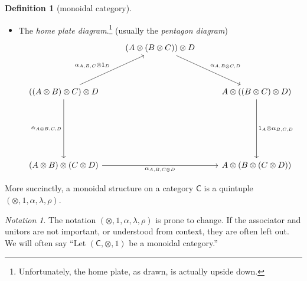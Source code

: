\documentclass[a4paper]{report}
\theoremstyle{definition}
\newtheorem{definition}{Definition}[section]
\theoremstyle{plain}
\theoremstyle{remark}
\newtheorem{notation}{Notation}[section]
\begin{document}
\begin{definition}[monoidal category]
\begin{itemize}
    \item The \emph{home plate diagram}.\footnote{Unfortunately, the home plate, as drawn, is actually upside down.} (usually the \emph{pentagon diagram})
      \begin{equation*}
        \begin{tikzcd}[row sep=huge]
          & (A \otimes (B \otimes C)) \otimes D 
          \arrow[dr, "\alpha_{A,B\otimes C, D}"] 
          \\
          ((A \otimes B) \otimes C) \otimes D 
          \arrow[ur, "\alpha_{A,B,C}\otimes 1_{D}"] 
          \arrow[dd, swap, "\alpha_{A\otimes B, C,D}"]
          & & A \otimes ((B \otimes C) \otimes D) 
          \arrow[dd, "1_{A}\otimes\alpha_{B,C,D}"]  
          \\
          \\
          (A \otimes B) \otimes (C \otimes D) 
          \arrow[rr, swap, "\alpha_{A,B,C\otimes D}"] 
          & & A \otimes(B \otimes (C \otimes D))
        \end{tikzcd}
      \end{equation*}
  \end{itemize}

  More succinctly, a monoidal structure on a category $\mathsf{C}$ is a quintuple $(\otimes, 1, \alpha, \lambda, \rho)$. 
\end{definition}

\begin{notation}
  The notation $(\otimes, 1, \alpha, \lambda, \rho)$ is prone to change. If the associator and unitors are not important, or understood from context, they are often left out. We will often say ``Let $(\mathsf{C}, \otimes, 1)$ be a monoidal category.''
\end{notation}
\end{document}
